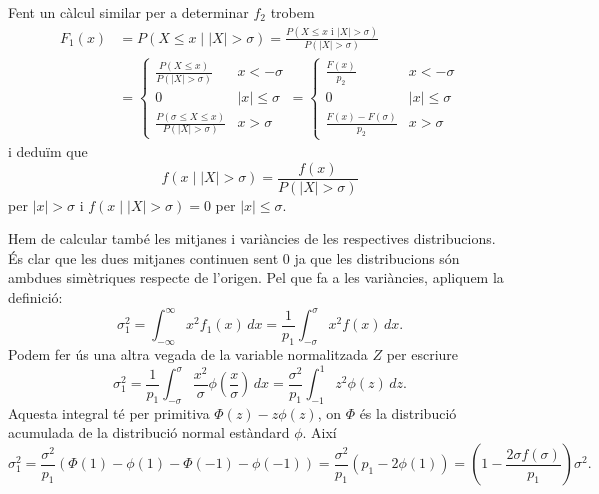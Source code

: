 \documentclass[12pt]{article}
\numberwithin{table}{section}
\numberwithin{figure}{section}
\numberwithin{equation}{section}
\newcommand{\abs}[1]{\left\lvert #1 \right\rvert}
\begin{document}
\begin{enumerate}[label=(\alph*), font=\bfseries \sffamily, wide, labelwidth=!, labelindent=0pt]
Fent un càlcul similar per a determinar \( f_2 \) trobem
\begin{align*}
	F_1(x) &= P(X \leq x \mid \abs{X} > \sigma) = \frac{P(X \leq x \text{ i } \abs{X} > \sigma)}{P(\abs{X} > \sigma)} \\
				 &= \left\{\begin{array}{lr}
	\frac{P(X \leq x)}{P(\abs{X} > \sigma)} & x < -\sigma \\ 
	0 & \abs{x} \leq \sigma \\
	\frac{P(\sigma \leq X \leq x)}{P(\abs{X} > \sigma)} & x > \sigma 
	\end{array} \right. 
	= \left\{\begin{array}{lr}
			\frac{F(x)}{p_2} & x < -\sigma \\ 
			0 & \abs{x} \leq \sigma \\
			\frac{F(x) - F(\sigma)}{p_2} & x > \sigma
	\end{array} \right.
\end{align*}
i deduïm que 
\begin{equation*}
	f(x \mid \abs{X} > \sigma) = \frac{f(x)}{P(\abs{X} > \sigma)}	
\end{equation*}
per \( \abs{x} > \sigma \) i \( f(x \mid \abs{X} > \sigma) = 0 \) per \( \abs{x} \leq \sigma \).

Hem de calcular també les mitjanes i variàncies de les respectives distribucions. És clar que les dues mitjanes continuen sent 0 ja que les distribucions són ambdues simètriques respecte de l'origen. Pel que fa a les variàncies, apliquem la definició:
\begin{equation*}
	\sigma_1^2 = \int_{-\infty}^{\infty} x^2f_1(x) \, dx = \frac{1}{p_1}\int_{-\sigma}^{\sigma}x^2 f(x)\,dx.
\end{equation*}
Podem fer ús una altra vegada de la variable normalitzada \( Z \) per escriure
\begin{equation*}
	\sigma_1^2 = \frac{1}{p_1}\int_{-\sigma}^{\sigma} \frac{x^2}{\sigma}\phi\left(\frac{x}{\sigma}\right)\,dx = \frac{\sigma^2}{p_1}\int_{-1}^{1} z^2\phi(z)\,dz.
\end{equation*}
Aquesta integral té per primitiva \( \Phi(z) - z\phi(z) \), on \( \Phi \) és la distribució acumulada de la distribució normal estàndard \( \phi \). Així
\begin{equation*}
	\sigma_1^2 = \frac{\sigma^2}{p_1} \left(\Phi(1) - \phi(1) - \Phi(-1) - \phi(-1)\right) = \frac{\sigma^2}{p_1}(p_1 - 2\phi(1)) = \left(1 - \frac{2\sigma f(\sigma)}{p_1}\right) \sigma^2.
\end{equation*}


\end{enumerate}
\end{document}
